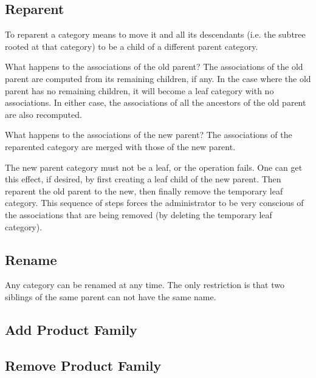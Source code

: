 \documentclass[letterpaper, 12pt]{article}
\begin{document}
\subsection{Reparent}
To reparent a category means to move it and all its descendants (i.e. the subtree rooted at that category) to be a child of a different parent category. 
\par
What happens to the associations of the old parent?  The associations of the old parent are computed from its remaining children, if any.  In the case where the old parent has no remaining children, it will become a leaf category with no associations.  In either case, the associations of all the ancestors of the old parent are also recomputed.
\par
What happens to the associations of the new parent?  The associations of the reparented category are merged with those of the new parent.
\par
The new parent category must not be a leaf, or the operation fails.  One can get this effect, if desired, by first creating a leaf child of the new parent.  Then reparent the old parent to the new, then finally remove the temporary leaf category.  This sequence of steps forces the administrator to be very conscious of the associations that are being removed (by deleting the temporary leaf category).

\subsection{Rename}
Any category can be renamed at any time.  The only restriction is that two siblings of the same parent can not have the same name.  

\subsection{Add Product Family}


\subsection{Remove Product Family}
\end{document}
